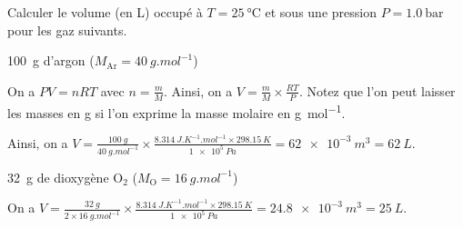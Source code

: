 \hauteurLargeurCadreReponse		{7mm}{30mm}
\initialisationEntrainement

Calculer le volume (en \si{L}) occupé à $T=\SI{25}{\celsius}$ et sous une pression $P =\SI{1.0}{\bar}$ pour les gaz suivants.

\debutEntrainement


\begin{enonce}
\SI{100}{g} d'argon ($M_\mathrm{Ar}=\SI{40}{g.mol^{-1}}$)	
\end{enonce}


\begin{corrige}
On a $PV=nRT$ avec $n=\frac{m}{M}$. Ainsi, on a $V=\frac{m}{M}\times \frac{RT}{P}$.
Notez que l'on peut laisser les masses en \si{g} si l'on exprime la masse molaire en \si{g.mol^{-1}}. 

Ainsi, on a
$V=\frac{\SI{100}{g} }{\SI{40}{g.mol^{-1}}}\times\frac{\SI{8,314}{J.K^{-1}.mol^{-1}}\times \SI{298.15}{K}}{\SI{1e5}{Pa}}=\SI{62e-3}{m^3}=\SI{62}{L}$.
\end{corrige}


\begin{enonce}
\SI{32}{g} de dioxygène $\mathrm{O_2}$ ($M_\mathrm{O}=\SI{16}{g.mol^{-1}}$)	
\end{enonce}


\begin{corrige}
On a $V=\frac{\SI{32}{g}}{2\times \SI{16}{g.mol^{-1}}}\times \frac{\SI{8,314}{J.K^{-1}.mol^{-1}}\times \SI{298.15}{K}}{\SI{1e5}{Pa}}=\SI{24.8e-3}{m^3}=\SI{25}{L}$.
\end{corrige}

